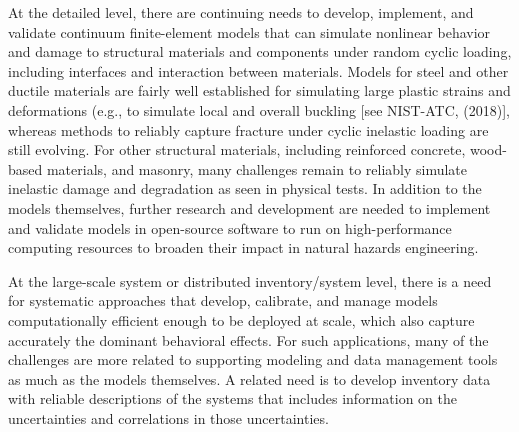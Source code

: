 At the detailed level, there are continuing needs to develop, implement, and validate continuum finite-element models that can simulate nonlinear behavior and damage to structural materials and components under random cyclic loading, including interfaces and interaction between materials. Models for steel and other ductile materials are fairly well established for simulating large plastic strains and deformations (e.g., to simulate local and overall buckling [see NIST-ATC, (2018)], whereas methods to reliably capture fracture under cyclic inelastic loading are still evolving. For other structural materials, including reinforced concrete, wood-based materials, and masonry, many challenges remain to reliably simulate inelastic damage and degradation as seen in physical tests. In addition to the models themselves, further research and development are needed to implement and validate models in open-source software to run on high-performance computing resources to broaden their impact in natural hazards engineering.

At the large-scale system or distributed inventory/system level, there is a need for systematic approaches that develop, calibrate, and manage models computationally efficient enough to be deployed at scale, which also capture accurately the dominant behavioral effects. For such applications, many of the challenges are more related to supporting modeling and data management tools as much as the models themselves. A related need is to develop inventory data with reliable descriptions of the systems that includes information on the uncertainties and correlations in those uncertainties. 
